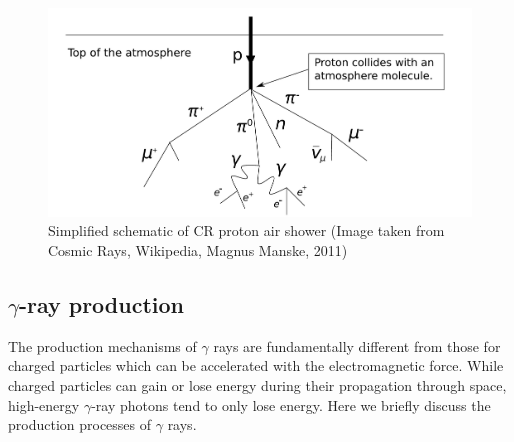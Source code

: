 \begin{figure}[h!]
    \centering
    \includegraphics[width=\textwidth]{content/background/figures/Atmospheric_Collision.pdf}
    \caption{
        Simplified schematic of CR proton air shower
        (Image taken from Cosmic Rays, Wikipedia, Magnus Manske, 2011)
    }
    \label{fig:cr_shower}
\end{figure}


\subsection{$\gamma$-ray production}

The production mechanisms of $\gamma$ rays are fundamentally
different from those for charged particles which can be
accelerated with the electromagnetic force.
While charged particles can gain or lose energy during their
propagation through space, high-energy $\gamma$-ray photons
tend to only lose energy.
Here we briefly discuss the production processes of $\gamma$ rays.

